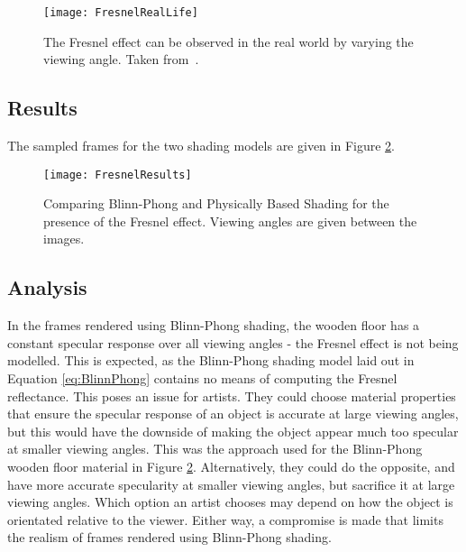 \begin{figure}[h]
	\centering
	\texttt{[image: FresnelRealLife]}
	\caption{The Fresnel effect can be observed in the real world by varying the viewing angle. Taken from~\cite{MarkusLecture}.}
	\label{fig:FresnelRealLife}
\end{figure}

\subsection{Results}

The sampled frames for the two shading models are given in Figure \ref{fig:FresnelResults}.

\begin{figure}[h]
	\centering
	\texttt{[image: FresnelResults]}
	\caption{Comparing Blinn-Phong and Physically Based Shading for the presence of the Fresnel effect. Viewing angles are given between the images.}
	\label{fig:FresnelResults}
\end{figure}

\subsection{Analysis}

In the frames rendered using Blinn-Phong shading, the wooden floor has a constant specular response over all viewing angles - the Fresnel effect is not being modelled. This is expected, as the Blinn-Phong shading model laid out in Equation \ref{eq:BlinnPhong} contains no means of computing the Fresnel reflectance. This poses an issue for artists. They could choose material properties that ensure the specular response of an object is accurate at large viewing angles, but this would have the downside of making the object appear much too specular at smaller viewing angles. This was the approach used for the Blinn-Phong wooden floor material in Figure \ref{fig:FresnelResults}. Alternatively, they could do the opposite, and have more accurate specularity at smaller viewing angles, but sacrifice it at large viewing angles. Which option an artist chooses may depend on how the object is orientated relative to the viewer. Either way, a compromise is made that limits the realism of frames rendered using Blinn-Phong shading.

